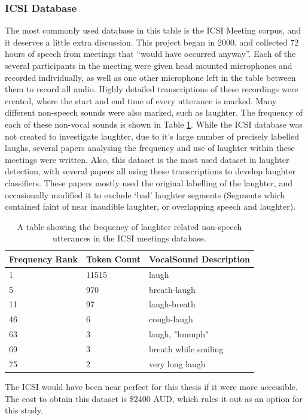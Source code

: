 \documentclass[a4paper,11pt,notitlepage]{article}
\begin{document}
\subsubsection{ICSI Database}
The most commonly used database in this table is the ICSI Meeting corpus, and it deserves a little extra discussion. This project began in 2000, and collected 72 hours of speech from meetings that ``would have occurred anyway''\cite{janin2003icsi}. Each of the several participants in the meeting were given head mounted microphones and recorded individually, as well as one other microphone left in the table between them to record all audio. Highly detailed transcriptions of these recordings were created, where the start and end time of every utterance is marked. Many different non-speech sounds were also marked, such as laughter. The frequency of each of these non-vocal sounds is shown in Table \ref{table:icsi_meeting_utterance_frequency}\cite{laskowski2007correlation}. While the ICSI database was not created to investigate laughter, due to it's large number of precisely labelled laughs, several papers analysing the frequency and use of laughter within these meetings were written. Also, this dataset is the most used dataset in laughter detection, with several papers all using these transcriptions to develop laughter classifiers.\cite{kennedy2004laughter,truong2005automatic,knox2007automatic} These papers mostly used the original labelling of the laughter, and occasionally modified it to exclude `bad' laughter segments (Segments which contained faint of near inaudible laughter, or overlapping speech and laughter)\cite{truong2005automatic}.
\begin{table}[H]
\centering
\begin{tabular}{|l|l|l|}
\hline
\textbf{Frequency Rank} & \textbf{Token Count} & \textbf{VocalSound Description} \\ \hline \hline
1                       & 11515                & laugh                           \\ \hline
5                       & 970                  & breath-laugh                    \\ \hline
11                      & 97                   & laugh-breath                    \\ \hline
46                      & 6                    & cough-laugh                     \\ \hline
63                      & 3                    & laugh, "hmmph"                  \\ \hline
69                      & 3                    & breath while smiling            \\ \hline
75                      & 2                    & very long laugh                 \\ \hline
\end{tabular}
\caption{A table showing the frequency of laughter related non-speech utterances in the ICSI meetings database\cite{laskowski2007correlation}.}
\label{table:icsi_meeting_utterance_frequency}
\end{table}
The ICSI would have been near perfect for this thesis if it were more accessible. The cost to obtain this dataset is \$2400 AUD, which rules it out as an option for this study.
\end{document}
